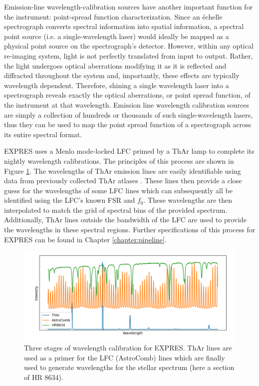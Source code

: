 Emission-line wavelength-calibration sources have another important function for the instrument: point-spread function characterization. Since an \'echelle spectrograph converts spectral information into spatial information, a spectral point source (i.e. a single-wavelength laser) would ideally be mapped as a physical point source on the spectrograph's detector. However, within any optical re-imaging system, light is not perfectly translated from input to output. Rather, the light undergoes optical aberrations modifying it as it is reflected and diffracted throughout the system and, importantly, these effects are typically wavelength dependent. Therefore, shining a single wavelength laser into a spectrograph reveals exactly the optical aberrations, or point spread function, of the instrument at that wavelength. Emission line wavelength calibration sources are simply a collection of hundreds or thousands of such single-wavelength lasers, thus they can be used to map the point spread function of a spectrograph across its entire spectral format.

EXPRES uses a Menlo mode-locked LFC primed by a ThAr lamp to complete its nightly wavelength calibrations. The principles of this process are shown in Figure \ref{fig:calibration}. The wavelengths of ThAr emission lines are easily identifiable using data from previously collected ThAr atlases \citep{palmer_atlas_1983, redman_spectrum_2014}. These lines then provide a close guess for the wavelengths of some LFC lines which can subsequently all be identified using the LFC's known FSR and $f_0$. These wavelengths are then interpolated to match the grid of spectral bins of the provided spectrum. Additionally, ThAr lines outside the bandwidth of the LFC are used to provide the wavelengths in these spectral regions. Further specifications of this process for EXPRES can be found in Chapter \ref{chapter:pipeline}.

\begin{figure}
    \centering
    \includegraphics[width=\textwidth]{figures-1/calibration.png}
    \caption[EXPRES wavelength calibration]{Three stages of wavelength calibration for EXPRES. ThAr lines are used as a primer for the LFC (AstroComb) lines which are finally used to generate wavelengths for the stellar spectrum (here a section of HR 8634).}
    \label{fig:calibration}
\end{figure}

